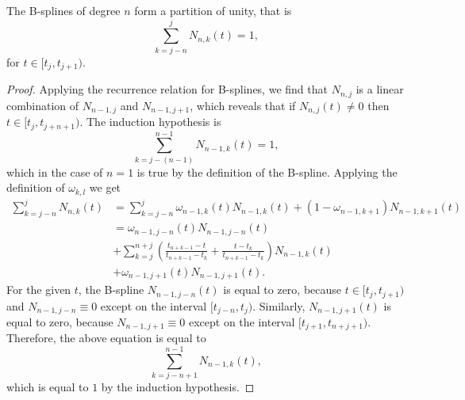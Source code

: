 
\begin{theorem}
	The B-splines of degree $n$ form a partition of unity, that is
	\begin{equation}
		\sum_{k=j-n}^j N_{n,k}(t) = 1,
	\end{equation}
	for $t \in [t_j, t_{j+1})$.
\end{theorem}
\begin{proof}
	Applying the recurrence relation for B-splines, we find that $N_{n,j}$ is a linear combination of $N_{n-1, j}$ and $N_{n-1, j+1}$, which reveals that if $N_{n, j}(t) \neq 0$ then $t \in [t_j, t_{j+n+1})$. The induction hypothesis is
	\begin{equation}
		\sum_{k=j-(n-1)}^{n-1} N_{n-1,k}(t) = 1,
	\end{equation}
	which in the case of $n=1$ is true by the definition of the B-spline. Applying the definition of $\omega_{k,l}$ we get
	\begin{align*}
		\sum_{k=j-n}^j N_{n,k}(t)	&= \sum_{k=j-n}^j \omega_{n-1, k}(t) N_{n-1, k}(t) + (1-\omega_{n-1, k+1}) N_{n-1, k+1}(t) \\
									&= \omega_{n-1, j-n}(t) N_{n-1, j-n}(t)\\
									&+ \sum_{k=j}^{n+j} \left(\frac{t_{n+k-1} - t}{t_{n+k-1} - t_{k}} + \frac{t - t_k}{t_{n+k-1} - t_k}\right) N_{n-1,k}(t)\\
									&+ \omega_{n-1, j+1}(t) N_{n-1, j+1}(t).
	\end{align*}
	For the given $t$, the B-spline $N_{n-1, j-n}(t)$ is equal to zero, because $t \in [t_j, t_{j+1})$ and $N_{n-1, j-n} \equiv 0$ except on the interval $[t_{j-n}, t_j)$.
	Similarly, $N_{n-1, j+1}(t)$ is equal to zero, because $N_{n-1, j+1} \equiv 0$ except on the interval $[t_{j+1}, t_{n+j+1})$. Therefore, the above equation is equal to
	\begin{equation}
		\sum_{k=j-n+1}^{n-1} N_{n-1,k}(t),
	\end{equation}
	which is equal to $1$ by the induction hypothesis.
\end{proof}